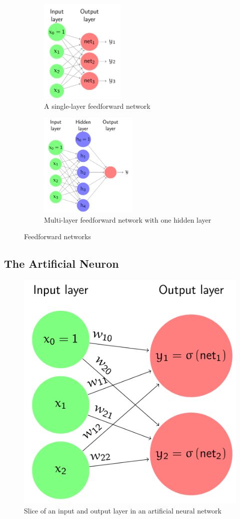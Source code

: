 \documentclass[11pt]{article}
\begin{document}
\begin{figure}[tbh!]
    \centering
    \begin{subfigure}{0.45\linewidth}
        \centering
        \includegraphics[keepaspectratio, height=5cm]{Pictures/singlelayer_feedforward_network}
        \caption{A single-layer feedforward network}
    \end{subfigure}
    \hfill
    \begin{subfigure}{0.45\linewidth}
        \centering
        \includegraphics[keepaspectratio, height=5cm]{Pictures/multilayer_feedforward_network}
        \caption{Multi-layer feedforward network with one hidden layer}
    \end{subfigure}
    \caption{Feedforward networks}
    \label{fig:feedforwardnetworks}
\end{figure}

\subsection{The Artificial Neuron}

\begin{figure}[tbh!]
    \centering
    \includegraphics[width=0.5\linewidth, keepaspectratio]{Pictures/artificial_neuron_layers}
    \caption{Slice of an input and output layer in an artificial neural network}
    \label{fig:artificialneuronlayers}
\end{figure}
\end{document}
